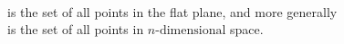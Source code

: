 \begin{example}
  \begin{itemize}
    \leavevmode
    \ii{\(\RR \cap \ZZ = \ZZ\)}
      \\is the set of all points in the flat plane, and more generally
      \\is the set of all points in \(n\text{-dimensional}\) space.
\end{itemize}
\end{example}

